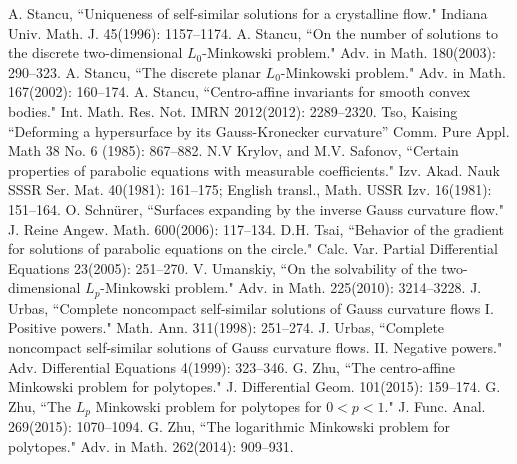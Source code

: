 \documentclass{amsart}
\theoremstyle{definition}
\theoremstyle{remark}
\numberwithin{equation}{section}
\begin{document}
\begin{thebibliography}{10}
A. Stancu, ``Uniqueness of self-similar solutions for a crystalline flow." Indiana Univ. Math. J. 45(1996): 1157--1174.
A. Stancu, ``On the number of solutions to the discrete two-dimensional $L_0$-Minkowski problem." Adv. in Math. 180(2003): 290--323.
 A. Stancu, ``The discrete planar $L_0$-Minkowski problem." Adv. in Math. 167(2002): 160--174.
 A. Stancu, ``Centro-affine invariants for smooth convex bodies."  Int. Math. Res. Not. IMRN 2012(2012): 2289--2320.
 Tso, Kaising ``Deforming a hypersurface by its {G}auss-{K}ronecker curvature'' Comm. Pure Appl. Math 38 No. 6 (1985): 867--882.
 N.V Krylov, and M.V. Safonov, ``Certain properties of parabolic equations with measurable coefficients." Izv. Akad. Nauk SSSR Ser. Mat. 40(1981): 161--175; English transl., Math. USSR Izv. 16(1981): 151--164.
 O. Schn\"{u}rer, ``Surfaces expanding by the inverse Gauss curvature flow."  J. Reine Angew. Math. 600(2006): 117--134.
 D.H. Tsai, ``Behavior of the gradient for solutions of parabolic equations on the circle." Calc. Var. Partial Differential Equations 23(2005): 251--270.
 V. Umanskiy, ``On the solvability of the two-dimensional $L_p$-Minkowski problem." Adv. in Math. 225(2010): 3214--3228.
 J. Urbas, ``Complete noncompact self-similar solutions of Gauss curvature flows I. Positive powers." Math. Ann. 311(1998): 251--274.
 J. Urbas, ``Complete noncompact self-similar solutions of Gauss curvature flows. II. Negative powers." Adv. Differential Equations 4(1999): 323--346.
  G. Zhu, ``The centro-affine Minkowski problem for polytopes." J. Differential Geom. 101(2015): 159--174.
 G. Zhu, ``The $L_p$ Minkowski problem for polytopes for $0<p<1$." J. Func. Anal. 269(2015): 1070--1094.
 G. Zhu, ``The logarithmic Minkowski problem for polytopes." Adv. in Math. 262(2014): 909--931.

\end{thebibliography}
\end{document}
